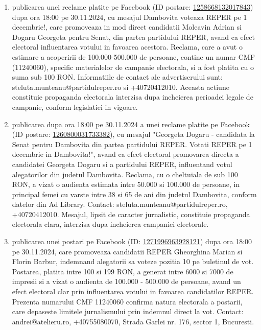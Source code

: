 \documentclass[a4paper,12pt]{article}
\begin{document}
\begin{enumerate}[leftmargin=*, label=\arabic*.)]
    \item publicarea unei reclame platite pe Facebook (ID postare: \href{https://www.facebook.com/ads/library/?id=1258668132017843}{1258668132017843}) dupa ora 18:00 pe 30.11.2024, cu mesajul Dambovita voteaza REPER pe 1 decembrie!, care promoveaza in mod direct candidatii Moleavin Adrian si Dogaru Georgeta pentru Senat, din partea partidului REPER, avand ca efect electoral influentarea votului in favoarea acestora.  Reclama, care a avut o estimare a acoperirii de 100.000-500.000 de persoane,  contine un numar CMF (11240060), specific materialelor de campanie electorala, si a fost platita cu o suma sub 100 RON.  Informatiile de contact ale advertiserului sunt: steluta.munteanu@partidulreper.ro si +40720412010.  Aceasta actiune constituie propaganda electorala interzisa dupa incheierea perioadei legale de campanie, conform legislatiei in vigoare.
    \item publicarea dupa ora 18:00 pe 30.11.2024 a unei reclame platite pe Facebook (ID postare: \href{https://www.facebook.com/ads/library/?id=1260800031733382}{1260800031733382}), cu mesajul "Georgeta Dogaru - candidata la Senat pentru Dambovita din partea partidului REPER. Votati REPER pe 1 decembrie in Dambovita!",  avand ca efect electoral promovarea directa a candidatei Georgeta Dogaru si a partidului REPER, influentand votul alegatorilor din judetul Dambovita.  Reclama, cu o cheltuiala de sub 100 RON, a vizat o audienta estimata intre 50.000 si 100.000 de persoane, in principal femei cu varste intre 38 si 65 de ani din judetul Dambovita, conform datelor din Ad Library.  Contact: steluta.munteanu@partidulreper.ro, +40720412010.  Mesajul, lipsit de caracter jurnalistic, constituie propaganda electorala clara, interzisa dupa incheierea campaniei electorale.
    \item publicarea unei postari pe Facebook (ID: \href{https://www.facebook.com/ads/library/?id=1271996963928121}{1271996963928121}) dupa ora 18:00 pe 30.11.2024, care promoveaza candidatii REPER Gheorghina Marian si Florin Barbur, indemnand alegatorii sa voteze pozitia 10 pe buletinul de vot. Postarea, platita intre 100 si 199 RON, a generat intre 6000 si 7000 de impresii si a vizat o audienta de 100.000 - 500.000 de persoane, avand un efect electoral clar prin influentarea votului in favoarea candidatilor REPER. Prezenta numarului CMF 11240060 confirma natura electorala a postarii, care depaseste limitele jurnalismului prin indemnul direct la vot.  Contact: andrei@atelieru.ro, +40755080070, Strada Garlei nr. 176, sector 1, Bucuresti.

\end{enumerate}
\end{document}
